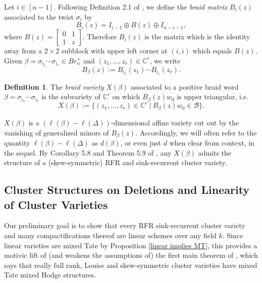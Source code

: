 \documentclass[11pt]{amsart}
\theoremstyle{definition}
\newtheorem{defn}[thm]{Definition}
\theoremstyle{remark}
\numberwithin{equation}{section}
\begin{document}
Let $i \in [n-1]$. Following Definition 2.1 of \cite{MR4868947}, we define the \textit{braid matrix} $B_i(z)$ associated to the twist $\sigma_i$ by
\begin{equation} B_i(z) = I_{i-1} \oplus B(z) \oplus I_{n - i - 1},
\end{equation}
\noindent where $B(z) = \begin{bmatrix}
    0      & 1  \\
    1       & z
\end{bmatrix}.$
Therefore $B_i(z)$ is the matrix which is the identity away from a $2 \times 2$ subblock with upper left corner at $(i,i)$ which equals $B(z)$. Given $\beta = \sigma_{i_1} \cdots \sigma_{i_r} \in Br^+_n$ and $(z_1, ..., z_r) \in \mathbb{C}^r$, we write 
\begin{equation}
    B_\beta(z) := B_{i_1}(z_1) \cdots B_{i_r}(z_r).
\end{equation}
\begin{defn}
    The \textit{braid variety} $X(\beta)$ associated to a positive braid word $\beta = \sigma_{i_1} \cdots \sigma_{i_r}$ is the subvariety of $\mathbb{C}^r$ on which $B_\beta(z)w_0$ is upper triangular, i.e.
    \begin{equation}
        X(\beta) := \{(z_1, ..., z_r) \in \mathbb{C}^r\:|\:B_\beta(z)w_0 \in \mathcal{B}\}.
    \end{equation}
\end{defn}

$X(\beta)$ is a $(\ell(\beta) - \ell(\Delta))$-dimensional affine variety cut out by the vanishing of generalized minors of $B_\beta(z)$. Accordingly, we will often refer to the quantity $\ell(\beta) - \ell(\Delta)$ as $d(\beta)$, or even just $d$ when clear from context, in the sequel. By Corollary 5.8 and Theorem 5.9 of \cite{galashin2022braid}, any $X(\beta)$ admits the structure of a (skew-symmetric) RFR and sink-recurrent cluster variety.

\subsection{Cluster Structures on Deletions and Linearity of Cluster Varieties}\label{subsection 4.2}

Our preliminary goal is to show that every RFR sink-recurrent cluster variety and many compactifications thereof are linear schemes over any field $k$. Since linear varieties are mixed Tate by Proposition \ref{linear implies MT}, this provides a motivic lift of (and weakens the assumptions of) the first main theorem of \cite{lam2022cohomology}, which says that really full rank, Louise and skew-symmetric cluster varieties have mixed Tate mixed Hodge structures.\\
\end{document}
